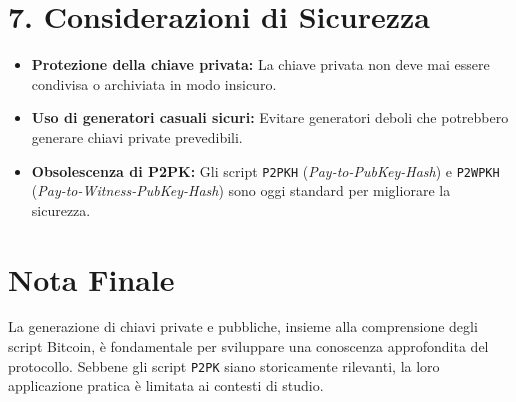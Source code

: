 \documentclass{article}
\begin{document}
\section*{7. Considerazioni di Sicurezza}
\begin{itemize}
    \item \textbf{Protezione della chiave privata:} La chiave privata non deve mai essere condivisa o archiviata in modo insicuro.
    \item \textbf{Uso di generatori casuali sicuri:} Evitare generatori deboli che potrebbero generare chiavi private prevedibili.
    \item \textbf{Obsolescenza di P2PK:} Gli script \texttt{P2PKH} (\textit{Pay-to-PubKey-Hash}) e \texttt{P2WPKH} (\textit{Pay-to-Witness-PubKey-Hash}) sono oggi standard per migliorare la sicurezza.
\end{itemize}

\section*{Nota Finale}
La generazione di chiavi private e pubbliche, insieme alla comprensione degli script Bitcoin, è fondamentale per sviluppare una conoscenza approfondita del protocollo. Sebbene gli script \texttt{P2PK} siano storicamente rilevanti, la loro applicazione pratica è limitata ai contesti di studio.
\end{document}
